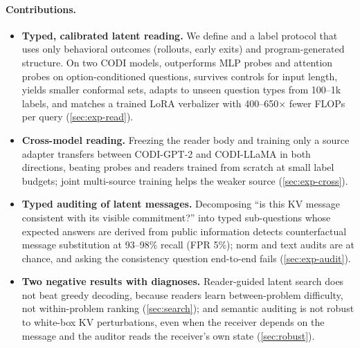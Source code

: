 \paragraph{Contributions.}
\begin{itemize}
\item \textbf{Typed, calibrated latent reading.} We define \clr{} and a label protocol that uses only behavioral outcomes (rollouts, early exits) and program-generated structure. On two CODI models, \clr{} outperforms MLP probes and attention probes on option-conditioned questions, survives controls for input length, yields smaller conformal sets, adapts to unseen question types from 100--1k labels, and matches a trained LoRA verbalizer with 400--650$\times$ fewer FLOPs per query (\cref{sec:exp-read}).
\item \textbf{Cross-model reading.} Freezing the reader body and training only a source adapter transfers between CODI-GPT-2 and CODI-LLaMA in both directions, beating probes and readers trained from scratch at small label budgets; joint multi-source training helps the weaker source (\cref{sec:exp-cross}).
\item \textbf{Typed auditing of latent messages.} Decomposing ``is this KV message consistent with its visible commitment?'' into typed sub-questions whose expected answers are derived from public information detects counterfactual message substitution at 93--98\% recall (FPR 5\%); norm and text audits are at chance, and asking the consistency question end-to-end fails (\cref{sec:exp-audit}).
\item \textbf{Two negative results with diagnoses.} Reader-guided latent search does not beat greedy decoding, because readers learn between-problem difficulty, not within-problem ranking (\cref{sec:search}); and semantic auditing is not robust to white-box KV perturbations, even when the receiver depends on the message and the auditor reads the receiver's own state (\cref{sec:robust}).
\end{itemize}


